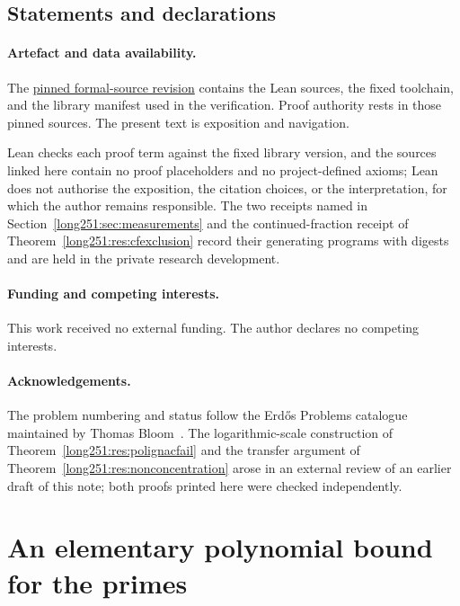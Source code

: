 \subsection*{Statements and declarations}

\paragraph{Artefact and data availability.} The
\href{\sourceurl}{pinned formal-source revision} contains the Lean sources, the
fixed toolchain, and the library manifest used in the verification.  Proof
authority rests in those pinned sources.  The present text is exposition and
navigation.

Lean checks each proof term against the fixed library version, and the sources
linked here contain no proof placeholders and no project-defined axioms; Lean
does not authorise the exposition, the citation choices, or the
interpretation, for which the author remains responsible.  The two receipts
named in Section~\ref{long251:sec:measurements} and the continued-fraction receipt of
Theorem~\ref{long251:res:cfexclusion} record their generating programs with digests
and are held in the private research development.

\paragraph{Funding and competing interests.} This work received no external
funding.  The author declares no competing interests.

\paragraph{Acknowledgements.} The problem numbering and status follow the
Erd\H{o}s Problems catalogue maintained by Thomas Bloom~\cite{erdosproblems}.
The logarithmic-scale construction of Theorem~\ref{long251:res:polignacfail} and the
transfer argument of Theorem~\ref{long251:res:nonconcentration} arose in an external
review of an earlier draft of this note; both proofs printed here were checked
independently.

\appendix
\section{An elementary polynomial bound for the primes}\label{long251:app:prime-bound}

